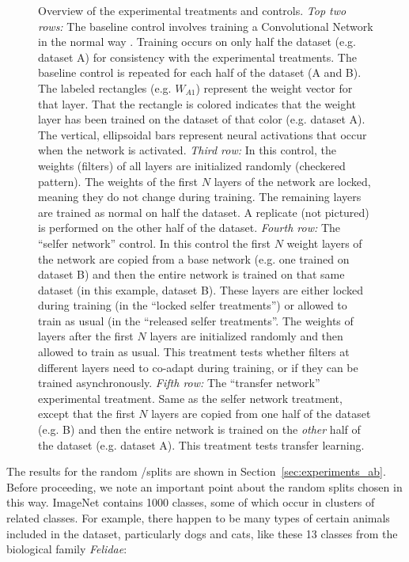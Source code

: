 \begin{figure}[htpb]
\caption{Overview of the experimental treatments and controls. \emph{Top two rows:} The baseline control involves training a Convolutional Network in the normal way \citep{Krizhevsky-2012}. Training occurs on only half the dataset (e.g. dataset A) for consistency with the experimental treatments. The baseline control is repeated for each half of the dataset (A and B). The labeled rectangles (e.g. $W_{A1}$) represent the weight vector for that layer. That the rectangle is colored indicates that the weight layer has been trained on the dataset of that color (e.g. dataset A). The vertical, ellipsoidal bars represent neural activations that occur when the network is activated. \emph{Third row:} In this control, the weights (filters) of all layers are initialized randomly (checkered pattern). The weights of the first $N$ layers of the network are locked, meaning they do not change during training. The remaining layers are trained as normal on half the dataset. A replicate (not pictured) is performed on the other half of the dataset. \emph{Fourth row:} The ``selfer network'' control. In this control the first $N$ weight layers of the network are copied from a base network (e.g. one trained on dataset B) and then the entire network is trained on that same dataset (in this example, dataset B). These layers are either locked during training (in the ``locked selfer treatments'') or allowed to train as usual (in the ``released selfer treatments''. The weights of layers after the first $N$ layers are initialized randomly and then allowed to train as usual. This treatment tests whether filters at different layers need to co-adapt during training, or if they can be trained asynchronously. \emph{Fifth row:} The ``transfer network'' experimental treatment. Same as the selfer network treatment, except that the first $N$ layers are copied from one half of the dataset (e.g. B) and then the entire network is trained on the \emph{other} half of the dataset (e.g. dataset A). This treatment tests transfer learning.}
\label{fig:transfer}
\end{figure}


The results for the random \dA/\dB splits are shown in Section~\ref{sec:experiments_ab}. Before proceeding, we note an important point about the random splits chosen in this way. ImageNet contains 1000 classes, some of which occur in clusters of related classes. For example, there happen to be many types of certain animals included in the dataset, particularly dogs and cats, like these 13 classes from the biological family \emph{Felidae}:

